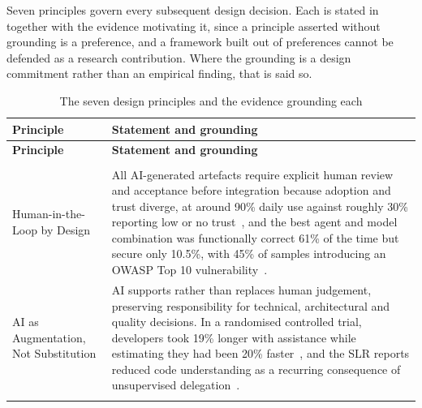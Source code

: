 
Seven principles govern every subsequent design decision. Each is stated in  together with the evidence motivating it, since a principle asserted without grounding is a preference, and a framework built out of preferences cannot be defended as a research contribution. Where the grounding is a design commitment rather than an empirical finding, that is said so.

{\footnotesize
\begin{longtable}{>{\raggedright\arraybackslash}p{3.4cm}
                  >{\raggedright\arraybackslash}p{11.6cm}}
\caption{The seven design principles and the evidence grounding each}
\label{tab:principles} \\

\toprule
\textbf{Principle} & \textbf{Statement and grounding} \\
\midrule
\endfirsthead

\toprule
\textbf{Principle} & \textbf{Statement and grounding} \\
\midrule
\endhead

\midrule
\multicolumn{2}{r}{\textit{Continued on next page}}\\
\bottomrule
\endfoot

\bottomrule
\endlastfoot

Human-in-the-Loop by Design &
All AI-generated artefacts require explicit human review and acceptance before integration because adoption and trust diverge, at around 90\% daily use against roughly 30\% reporting low or no trust~\cite{DORA:2025ai}, and the best agent and model combination was functionally correct 61\% of the time but secure only 10.5\%, with 45\% of samples introducing an OWASP Top 10 vulnerability~\cite{Zhao:2025vibe, Veracode:2025gen}. \\
\addlinespace

\ac{AI} as Augmentation, Not Substitution &
AI supports rather than replaces human judgement, preserving responsibility for technical, architectural and quality decisions. In a randomised controlled trial, developers took 19\% longer with assistance while estimating they had been 20\% faster~\cite{Becker:2025rct}, and the \ac{SLR} reports reduced code understanding as a recurring consequence of unsupervised delegation~\cite{Banh:2025cf, Basha:2025tt, Jensen:2025me, Zamfiroiu:2025ec}. \\
\addlinespace


\end{longtable}}
